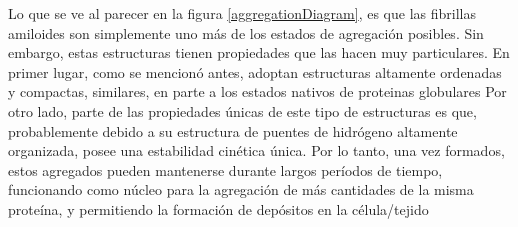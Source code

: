Lo que se ve al parecer en la figura \ref{aggregationDiagram}, es que las fibrillas amiloides son simplemente uno más de los estados de agregación posibles.
Sin embargo, estas estructuras tienen propiedades que las hacen muy particulares.
En primer lugar, como se mencionó antes, adoptan estructuras altamente ordenadas y compactas, similares, en parte a los estados nativos de proteinas globulares
Por otro lado, parte de las propiedades únicas de este tipo de estructuras es que, probablemente debido a su estructura de puentes de hidrógeno altamente organizada, posee una estabilidad cinética única.
Por lo tanto, una vez formados, estos agregados pueden mantenerse durante largos períodos de tiempo, funcionando como núcleo para la agregación de más cantidades de la misma proteína, 
y permitiendo la formación de depósitos en la célula/tejido



